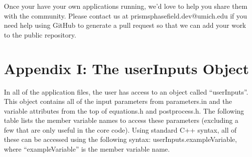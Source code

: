 \documentclass[10pt]{article} %
\begin{document}
Once your have your own applications running, we'd love to help you share them with the community. Please contact us at prismsphasefield.dev@umich.edu if you need help using GitHub to generate a pull request so that we can add your work to the public repository.

\section{Appendix I: The userInputs Object}
In all of the application files, the user has access to an object called ``userInputs''. This object contains all of the input parameters from parameters.in and the variable attributes from the top of equations.h and postprocess.h. The following table lists the member variable names to access these parameters (excluding a few that are only useful in the core code). Using standard C++ syntax, all of these can be accessed using the following syntax: userInputs.exampleVariable, where ``exampleVariable'' is the member variable name.
\end{document}
